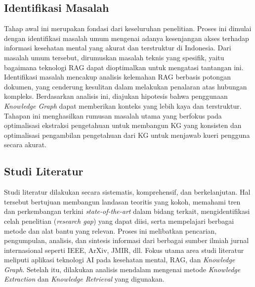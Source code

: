 \subsection{Identifikasi Masalah}
Tahap awal ini merupakan fondasi dari keseluruhan penelitian. Proses ini dimulai dengan identifikasi masalah umum mengenai adanya kesenjangan akses terhadap informasi kesehatan mental yang akurat dan terstruktur di Indonesia.
Dari masalah umum tersebut, dirumuskan masalah teknis yang spesifik, yaitu bagaimana teknologi RAG dapat dioptimalkan untuk mengatasi tantangan ini.
Identifikasi masalah mencakup analisis kelemahan RAG berbasis potongan dokumen, yang cenderung kesulitan dalam melakukan penalaran atas hubungan kompleks.
Berdasarkan analisis ini, diajukan hipotesis bahwa penggunaan \textit{Knowledge Graph} dapat memberikan konteks yang lebih kaya dan terstruktur.
Tahapan ini menghasilkan rumusan masalah utama yang berfokus pada optimalisasi ekstraksi pengetahuan untuk membangun KG yang konsisten dan optimalisasi pengambilan pengetahuan dari KG untuk menjawab kueri pengguna secara akurat.

\subsection{Studi Literatur}
Studi literatur dilakukan secara sistematis, komprehensif, dan berkelanjutan.
Hal tersebut bertujuan membangun landasan teoritis yang kokoh, memahami tren dan perkembangan terkini \textit{state-of-the-art} dalam bidang terkait, mengidentifikasi celah penelitian (\textit{research gap}) yang dapat diisi, serta mempelajari berbagai metode dan alat bantu yang relevan.
Proses ini melibatkan pencarian, pengumpulan, analisis, dan sintesis informasi dari berbagai sumber ilmiah jurnal internasional seperti IEEE, ArXiv, JMIR, dll.
Fokus utama area studi literatur meliputi aplikasi teknologi AI pada kesehatan mental, RAG, dan \textit{Knowledge Graph}.
Setelah itu, dilakukan analisis mendalam mengenai metode \textit{Knowledge Extraction} dan \textit{Knowledge Retrieval} yang digunakan.

